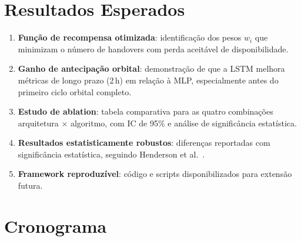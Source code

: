 \documentclass[12pt,a4paper]{article}
\begin{document}
\section{Resultados Esperados}

\begin{enumerate}
  \item \textbf{Função de recompensa otimizada}: identificação dos pesos $w_i$
        que minimizam o número de handovers com perda aceitável de disponibilidade.
  \item \textbf{Ganho de antecipação orbital}: demonstração de que a LSTM
        melhora métricas de longo prazo (2\,h) em relação à MLP, especialmente
        antes do primeiro ciclo orbital completo.
  \item \textbf{Estudo de ablation}: tabela comparativa para as quatro
        combinações arquitetura $\times$ algoritmo, com IC de 95\% e análise de
        significância estatística.
  \item \textbf{Resultados estatisticamente robustos}: diferenças reportadas com
        significância estatística, seguindo Henderson et al.~\cite{henderson2018}.
  \item \textbf{Framework reproduzível}: código e scripts disponibilizados para
        extensão futura.
\end{enumerate}

\section{Cronograma}
\end{document}
